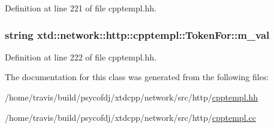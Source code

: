 Definition at line 221 of file cpptempl.\-hh.

\hypertarget{classxtd_1_1network_1_1http_1_1cpptempl_1_1TokenFor_a262fbad437a0b5aeed05a73c315f865b}{
\subsubsection[{m\-\_\-val}]{\setlength{\rightskip}{0pt plus 5cm}string xtd\-::network\-::http\-::cpptempl\-::\-Token\-For\-::m\-\_\-val}}\label{classxtd_1_1network_1_1http_1_1cpptempl_1_1TokenFor_a262fbad437a0b5aeed05a73c315f865b}


Definition at line 222 of file cpptempl.\-hh.



The documentation for this class was generated from the following files\-:\begin{DoxyCompactItemize}
\item 
/home/travis/build/psycofdj/xtdcpp/network/src/http/\hyperlink{cpptempl_8hh}{cpptempl.\-hh}\item 
/home/travis/build/psycofdj/xtdcpp/network/src/http/\hyperlink{cpptempl_8cc}{cpptempl.\-cc}\end{DoxyCompactItemize}
